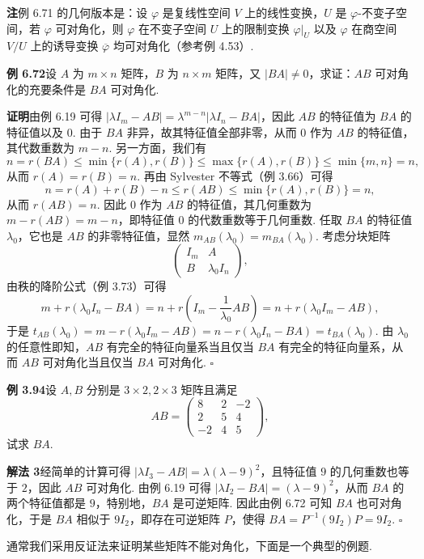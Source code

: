 \documentclass[UTF8, 12pt, fontset=fandol, oneside]{ctexart}
\begin{document}
\noindent\textbf{注}\quad 例 6.71 的几何版本是：设 $\varphi$ 是复线性空间 $V$ 上的线性变换，$U$ 是 $\varphi$-不变子空间，若 $\varphi$ 可对角化，则 $\varphi$ 在不变子空间 $U$ 上的限制变换 $\varphi|_U$ 以及 $\varphi$ 在商空间 $V/U$ 上的诱导变换 $\overline{\varphi}$ 均可对角化（参考例 4.53）.

\noindent\textbf{例 6.72}\quad 设 $A$ 为 $m\times n$ 矩阵，$B$ 为 $n\times m$ 矩阵，又 $|BA|\ne 0$，求证：$AB$ 可对角化的充要条件是 $BA$ 可对角化.

\noindent\textbf{证明}\quad 由例 6.19 可得 $|\lambda I_m-AB|=\lambda^{m-n}|\lambda I_n-BA|$，因此 $AB$ 的特征值为 $BA$ 的特征值以及 $0$. 由于 $BA$ 非异，故其特征值全部非零，从而 $0$ 作为 $AB$ 的特征值，其代数重数为 $m-n$. 另一方面，我们有
\[
n=r(BA)\le \min\{r(A),r(B)\}\le \max\{r(A),r(B)\}\le \min\{m,n\}=n,
\]
从而 $r(A)=r(B)=n$. 再由 Sylvester 不等式（例 3.66）可得
\[
n=r(A)+r(B)-n\le r(AB)\le \min\{r(A),r(B)\}=n,
\]
从而 $r(AB)=n$. 因此 $0$ 作为 $AB$ 的特征值，其几何重数为 $m-r(AB)=m-n$，即特征值 $0$ 的代数重数等于几何重数. 任取 $BA$ 的特征值 $\lambda_0$，它也是 $AB$ 的非零特征值，显然 $m_{AB}(\lambda_0)=m_{BA}(\lambda_0)$. 考虑分块矩阵
\[
\left(\begin{array}{cc}
I_m & A\\
B & \lambda_0I_n
\end{array}\right),
\]
由秩的降阶公式（例 3.73）可得
\[
m+r(\lambda_0I_n-BA)=n+r\left(I_m-\frac{1}{\lambda_0}AB\right)=n+r(\lambda_0I_m-AB),
\]
于是 $t_{AB}(\lambda_0)=m-r(\lambda_0I_m-AB)=n-r(\lambda_0I_n-BA)=t_{BA}(\lambda_0)$. 由 $\lambda_0$ 的任意性即知，$AB$ 有完全的特征向量系当且仅当 $BA$ 有完全的特征向量系，从而 $AB$ 可对角化当且仅当 $BA$ 可对角化. $\square$

\noindent\textbf{例 3.94}\quad 设 $A,B$ 分别是 $3\times 2,2\times 3$ 矩阵且满足
\[
AB=\left(\begin{array}{ccc}
8 & 2 & -2\\
2 & 5 & 4\\
-2 & 4 & 5
\end{array}\right),
\]
试求 $BA$.

\noindent\textbf{解法 3}\quad 经简单的计算可得 $|\lambda I_3-AB|=\lambda(\lambda-9)^2$，且特征值 $9$ 的几何重数也等于 $2$，因此 $AB$ 可对角化. 由例 6.19 可得 $|\lambda I_2-BA|=(\lambda-9)^2$，从而 $BA$ 的两个特征值都是 $9$，特别地，$BA$ 是可逆矩阵. 因此由例 6.72 可知 $BA$ 也可对角化，于是 $BA$ 相似于 $9I_2$，即存在可逆矩阵 $P$，使得 $BA=P^{-1}(9I_2)P=9I_2$. $\square$

通常我们采用反证法来证明某些矩阵不能对角化，下面是一个典型的例题.
\end{document}

